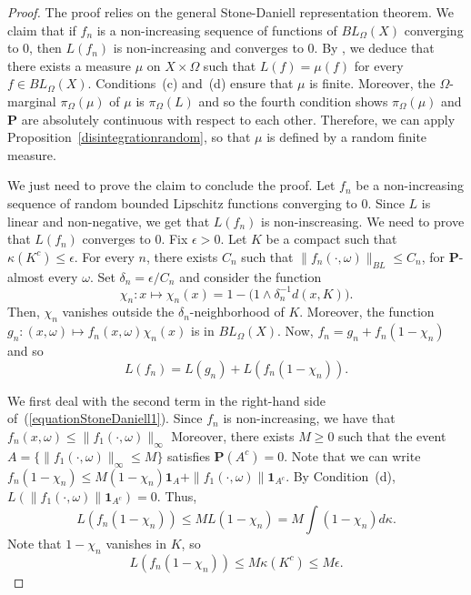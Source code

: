 \documentclass{amsart}
\theoremstyle{definition}
\theoremstyle{remark}
\begin{document}
\begin{proof}
The proof relies on the general Stone-Daniell representation theorem.
We claim that if $f_n$ is a non-increasing sequence of functions of $BL_\Omega(X)$ converging to 0, then $L(f_n)$ is non-increasing and converges to 0.
By \cite[Theorem~4.11]{Crauel}, we deduce that there exists a measure $\mu$ on $X\times \Omega$ such that $L(f)=\mu(f)$ for every $f\in BL_\Omega(X)$.
Conditions~(c) and~(d) ensure that $\mu$ is finite.
Moreover, the $\Omega$-marginal $\pi_\Omega(\mu)$ of $\mu$ is $\pi_\Omega(L)$ and so the fourth condition shows $\pi_\Omega(\mu)$ and $\mathbf P$ are absolutely continuous with respect to each other.
Therefore, we can apply Proposition~\ref{disintegrationrandom}, so that $\mu$ is defined by a random finite measure.

We just need to prove the claim to conclude the proof.
Let $f_n$ be a non-increasing sequence of random bounded Lipschitz functions converging to 0.
Since $L$ is linear and non-negative, we get that $L(f_n)$ is non-inscreasing.
We need to prove that $L(f_n)$ converges to 0.
Fix $\epsilon>0$.
Let $K$ be a compact such that $\kappa(K^c)\leq \epsilon$.
For every $n$, there exists $C_n$ such that $\|f_n(\cdot,\omega)\|_{BL}\leq C_n$, for $\mathbf P$-almost every $\omega$.
Set $\delta_n=\epsilon/C_n$ and consider the function
$$\chi_n:x\mapsto \chi_n(x)=1-\big(1\wedge \delta_n^{-1}d(x,K)\big).$$
Then, $\chi_n$ vanishes outside the $\delta_n$-neighborhood of $K$.
Moreover, the function
$g_n:(x,\omega)\mapsto f_n(x,\omega)\chi_n(x)$ is in $BL_\Omega(X)$.
Now, $f_n=g_n+f_n(1-\chi_n)$ and so
\begin{equation}\label{equationStoneDaniell1}
    L(f_n)=L(g_n)+L(f_n(1-\chi_n)).
\end{equation}

We first deal with the second term in the right-hand side of~(\ref{equationStoneDaniell1}).
Since $f_n$ is non-increasing, we have that $f_n(x,\omega)\leq \|f_1(\cdot,\omega)\|_\infty$ Moreover, there exists $M\geq 0$ such that the event $A=\{\|f_1(\cdot,\omega)\|_\infty\leq M\}$ satisfies $\mathbf P(A^c)=0$.
Note that we can write $f_n(1-\chi_n)\leq M(1-\chi_n)\mathbf 1_A+\|f_1(\cdot,\omega)\|\mathbf 1_{A^c}$.
By Condition~(d), $L(\|f_1(\cdot,\omega)\|\mathbf 1_{A^c})=0$.
Thus,
$$L(f_n(1-\chi_n))\leq ML(1-\chi_n)=M\int (1-\chi_n)d\kappa.$$
Note that $1-\chi_n$ vanishes in $K$, so
\begin{equation}\label{equationStoneDaniell2}
L(f_n(1-\chi_n))\leq M\kappa (K^c)\leq M\epsilon.
\end{equation}


\end{proof}
\end{document}
